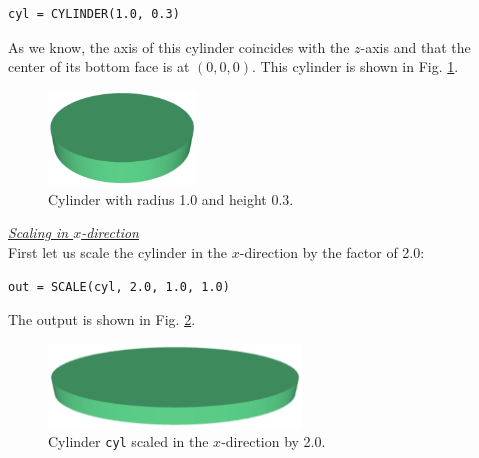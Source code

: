 \begin{bbox}
\begin{verbatim}
cyl = CYLINDER(1.0, 0.3)
\end{verbatim}
\end{bbox}
\vspace{6mm}

\noindent
As we know, the axis of this cylinder coincides with the $z$-axis 
and that the center of its bottom face is at $(0, 0, 0)$. This cylinder is shown 
in Fig. \ref{fig:scale-0}.
\newpage

\begin{figure}[!ht]
\begin{center}
\includegraphics[width=0.35\textwidth]{img/scale-0.png}
\end{center}
\vspace{-4mm}
\caption{Cylinder with radius 1.0 and height 0.3.}
\label{fig:scale-0}
\end{figure}

\noindent
\underline{\em Scaling in $x$-direction}\\

First let us scale the cylinder in the $x$-direction by the factor of 2.0: \\

\begin{bbox}
\begin{verbatim}
out = SCALE(cyl, 2.0, 1.0, 1.0)
\end{verbatim}
\end{bbox}
\vspace{6mm}

\noindent
\noindent
The output is shown in Fig. \ref{fig:scale-1}.

\begin{figure}[!ht]
\begin{center}
\includegraphics[width=0.6\textwidth]{img/scale-1.png}
\end{center}
\vspace{-4mm}
\caption{Cylinder {\tt cyl} scaled in the $x$-direction by 2.0.}
\label{fig:scale-1}
\end{figure}

